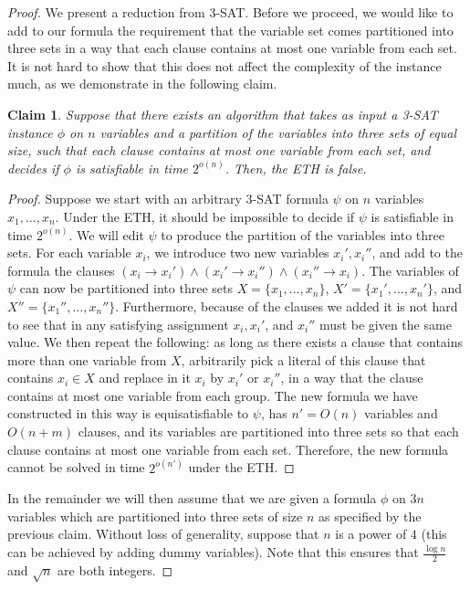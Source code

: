 \documentclass[a4paper]{article}
\theoremstyle{plain}
\newtheorem{claim}[theorem]{Claim}%
\begin{document}
\begin{proof}

We present a reduction from \textsc{3-SAT}. Before we proceed, we would like to
add to our formula the requirement that the variable set comes partitioned into
three sets in a way that each clause contains at most one variable from each
set. It is not hard to show that this does not affect the complexity of the
instance much, as we demonstrate in the following claim.

\begin{claim}\label{claim:tsat3} %
Suppose that there exists an algorithm that takes as input a
\textsc{3-SAT} instance $\phi$ on $n$ variables and a partition of the
variables into three sets of equal size, such that each clause contains at most
one variable from each set, and decides if $\phi$ is satisfiable in time
$2^{o(n)}$. Then, the ETH is false. \end{claim}

%
\begin{proof}%
Suppose we start with an arbitrary \textsc{3-SAT} formula $\psi$
on $n$ variables $x_1,\ldots,x_n$. Under the ETH, it should be impossible to
decide if $\psi$ is satisfiable in time $2^{o(n)}$. We will edit $\psi$ to
produce the partition of the variables into three sets. For each variable
$x_i$, we introduce two new variables $x_i', x_i''$, and add to the formula the
clauses $(x_i\to x_i')\land (x_i'\to x_i'')\land (x_i''\to x_i)$.  The
variables of $\psi$ can now be partitioned into three sets $X =
\{x_1,\ldots,x_n\}$, $X'=\{ x_1',\ldots,x_n'\}$, and $X''=\{
x_1'',\ldots,x_n''\}$. Furthermore, because of the clauses we added it is not
hard to see that in any satisfying assignment $x_i, x_i'$, and $x_i''$ must be
given the same value. We then repeat the following: as long as there exists a
clause that contains more than one variable from $X$, arbitrarily pick a
literal of this clause that contains $x_i\in X$ and replace in it $x_i$ by
$x_i'$ or $x_i''$, in a way that the clause contains at most one variable from
each group. The new formula we have constructed in this way is equisatisfiable
to $\psi$, has $n'=O(n)$ variables and $O(n+m)$ clauses, and its variables are
partitioned into three sets so that each clause contains at most one variable
from each set. Therefore, the new formula cannot be solved in time $2^{o(n')}$
under the ETH.  \end{proof}
    
%

In the remainder we will then assume that we are given a formula $\phi$ on $3n$
variables which are partitioned into three sets of size $n$ as specified by the
previous claim. Without loss of generality, suppose that $n$ is a power of $4$
(this can be achieved by adding dummy variables). Note that this ensures that
$\frac{\log n}{2}$ and $\sqrt{n}$ are both integers.


\end{proof}
\end{document}
